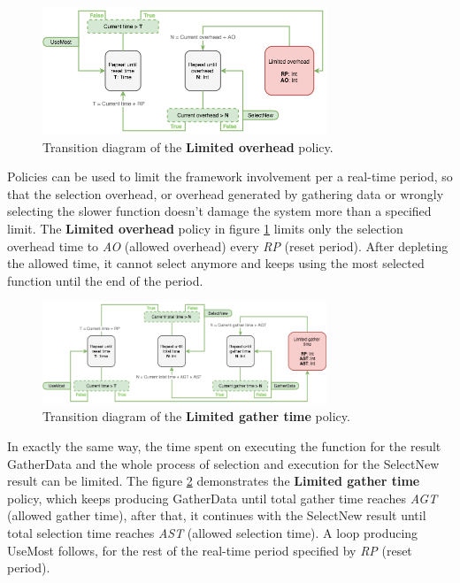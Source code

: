 \begin{figure}[h!]
	\captionsetup{justification=centering,margin=0.5cm}
	\centerline{\mbox{\includegraphics[width=85mm]{./img/limited_overhead.png}}}
	\caption{Transition diagram of the \textbf{Limited overhead} policy.}
	\label{fig:limited_overhead}
\end{figure}

Policies can be used to limit the framework involvement per a real-time period, so that the selection overhead, or overhead generated by gathering data or wrongly selecting the slower function doesn't damage the system more than a specified limit. The \textbf{Limited overhead} policy in figure \ref{fig:limited_overhead} limits only the selection overhead time to \textit{AO} (allowed overhead) every \textit{RP} (reset period). After depleting the allowed time, it cannot select anymore and keeps using the most selected function until the end of the period.

\begin{figure}[h!]
	\captionsetup{justification=centering,margin=0.5cm}
	\centerline{\mbox{\includegraphics[width=85mm]{./img/limited_gather_time.png}}}
	\caption{Transition diagram of the \textbf{Limited gather time} policy.}
	\label{fig:limited_gather_time}
\end{figure}

In exactly the same way, the time spent on executing the function for the result GatherData and the whole process of selection and execution for the SelectNew result can be limited. The figure \ref{fig:limited_gather_time} demonstrates the \textbf{Limited gather time} policy, which keeps producing GatherData until total gather time reaches \textit{AGT} (allowed gather time), after that, it continues with the SelectNew result until total selection time reaches \textit{AST} (allowed selection time). A loop producing UseMost follows, for the rest of the real-time period specified by \textit{RP} (reset period).

